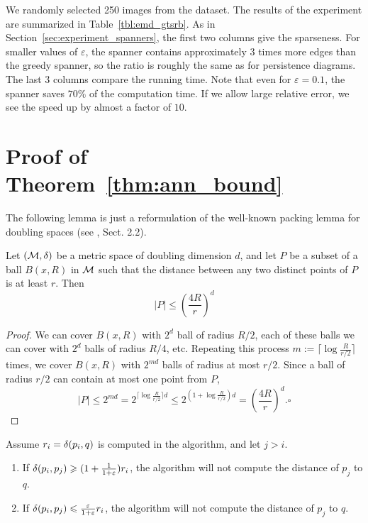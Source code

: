 \documentclass[]{ws-ijcga}
\renewcommand{\leq}{\leqslant}
\renewcommand{\geq}{\geqslant}
\newcommand{\eps}{\varepsilon}
\begin{document}
We randomly selected 250 images from the dataset.
The results of the experiment are summarized in Table~\ref{tbl:emd_gtsrb}.
As in Section~\ref{sec:experiment_spanners}, 
the first two columns give the sparseness.
For smaller values of $\eps$,
the \bgrdy spanner contains approximately 3 times more
edges than the greedy spanner, so the ratio is roughly
the same as for persistence diagrams.
The last 3 columns compare the running time.
Note that even for $\eps=0.1$,
the \bgrdy spanner saves $70\%$ of the computation time.
If we allow large relative error,
we see the speed up by almost a factor of $10$.



\section{Proof of Theorem~\ref{thm:ann_bound}}
\label{sec:proof_ann}

The following lemma is just a reformulation of the well-known
packing lemma for doubling spaces (see \cite{smid_2009}, Sect. 2.2).

\begin{lemma}
\label{lem:packing_lemma}
 Let $(\mathcal{M},\delta)$ be a metric space of doubling dimension $d$, and let $P$ be a subset of a ball 
 $B(x,R)$ in $\mathcal{M}$ such that the distance between any two distinct points of $P$ is at least $r$.
 Then 
 \[|P|\leq \left(\frac{4R}{r}\right)^{d}\]

\end{lemma}
\begin{proof}
We can cover $B(x,R)$ with $2^d$ ball of radius $R/2$, each of these balls we can cover with $2^d$
balls of radius $R/4$, etc. Repeating this process $m := \lceil \log \frac{R}{r/2} \rceil$ times, 
we cover
$B(x, R)$ with $2^{md}$ balls of radius at most $r/2$. Since a ball of radius $r/2$ can
contain at most one point from $P$, 
\[|P|\leq 2^{md}= 2^{\lceil \log \frac{R}{r/2} \rceil d}\leq 2^{(1 + \log \frac{R}{r/2})d}=\left(\frac{4R}{r}\right)^{d}.\square\]
\end{proof}


\begin{lemma}
\label{lem:bound_lemma}
Assume $r_i=\delta(p_i,q)$ is computed in the algorithm, and let $j>i$.
\begin{enumerate}
\item If $\dist(p_i,p_j)\geq (1+\frac{1}{1+\eps}) r_i$, the algorithm will not compute the distance
of $p_j$ to $q$.
\item If $\dist(p_i,p_j)\leq\frac{\eps}{1+\eps}r_i$, the algorithm will not compute
the distance of $p_j$ to $q$.
\end{enumerate}
\end{lemma}
\end{document}
